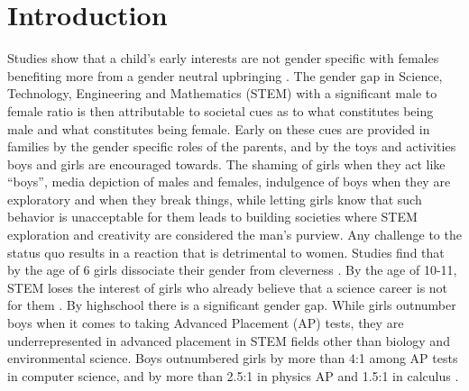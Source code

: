 \documentclass[utf8]{frontiersSCNS} %
\begin{document}
\section{Introduction}
Studies show that a child’s early interests are not gender specific with females benefiting more from a gender neutral upbringing \citep{raag1999influences,shutts2017early}. The gender gap in Science, Technology, Engineering and Mathematics (STEM) with a significant male to female ratio is then attributable to societal cues as to what constitutes being male and what constitutes being female. Early on these cues are provided in families by the gender specific roles of the parents, and by the toys and activities boys and girls are encouraged towards. The shaming of girls when they act like “boys”, media depiction of males and females, indulgence of boys when they are exploratory and when they break things, while letting girls know that such behavior is unacceptable for them leads to building societies where STEM exploration and creativity are considered the man’s purview. Any challenge to the status quo results in a reaction that is detrimental to women. Studies find that by the age of 6 girls dissociate their gender from cleverness \citep{bian2017gender,bian2018messages}. By the age of 10-11, STEM loses the interest of girls who already believe that a science career is not for them \citep{archer2012balancing}. By highschool there is a significant gender gap. While girls outnumber boys when it comes to taking Advanced Placement (AP) tests, they are underrepresented in advanced placement in STEM fields other than biology and environmental science. Boys outnumbered girls by more than 4:1 among AP tests in computer science, and by more than 2.5:1 in physics AP and 1.5:1 in calculus \citep{ericson2013detailed}.




\end{document}
